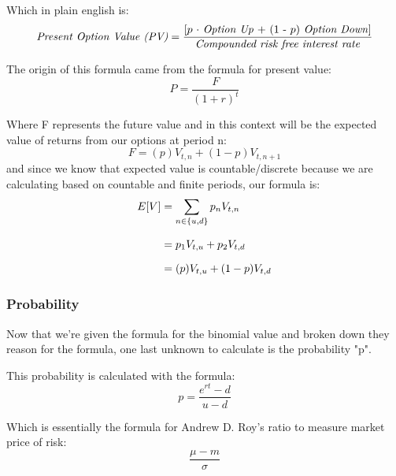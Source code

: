 \documentclass[12pt, letterpaper]{article}
\begin{document}
Which in plain english is:
\begin{equation*}
  \textrm{\textit{Present Option Value (PV)}} = \frac{\textrm{[${p}$ ${\cdot}$ \textit{Option Up} + (1 - ${p}$) \textit{Option Down}]}}{\textrm{\textit{Compounded risk free interest rate}}}
\end{equation*}

The origin of this formula came from the formula for present value: %
\begin{equation*}
  P = \frac{F}{(1+r)^t}
\end{equation*}

Where F represents the future value and in this context will be the expected value of returns from our options at period n:
\begin{equation*}
  F = (p)V_{t,n} + (1-p)V_{t,n+1}
\end{equation*}
and since we know that expected value is countable/discrete because we are calculating based on countable and finite periods, our formula is:
\begin{equation*}
  \setlength{\jot}{10pt}
  \begin{split}
    E[V] 
    & = \sum\limits_{n \in \{u,d\}} p_n V_{t,n} \\
    & = p_1 V_{t,u} + p_2 V_{t,d} \\
    & = (p) V_{t,u} + (1-p) V_{t,d} \\
  \end{split}
\end{equation*}

\subsubsection*{Probability}
Now that we're given the formula for the binomial value and broken down they reason for the formula, one last unknown to calculate is the probability "p".

This probability is calculated with the formula:
\begin{equation*}
  p = \frac{e^{rt} - d}{u - d}
\end{equation*}

Which is essentially the formula for Andrew D. Roy's ratio to measure market price of risk:
\begin{equation*}
  \frac{\mu - m}{\sigma}
\end{equation*}
\end{document}
